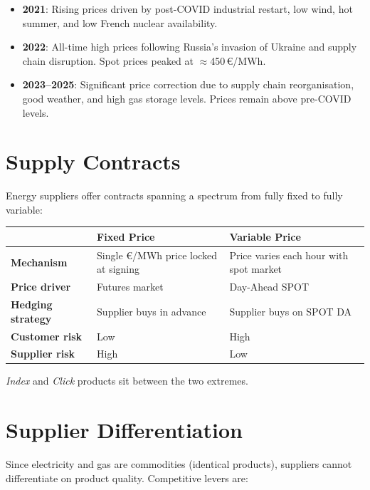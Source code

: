 \begin{itemize}[noitemsep]
    \item \textbf{2021}: Rising prices driven by post-COVID industrial restart, low wind, hot summer, and low French nuclear availability.
    \item \textbf{2022}: All-time high prices following Russia's invasion of Ukraine and supply chain disruption. Spot prices peaked at $\approx$450\,€/MWh.
    \item \textbf{2023–2025}: Significant price correction due to supply chain reorganisation, good weather, and high gas storage levels. Prices remain above pre-COVID levels.
\end{itemize}

\section{Supply Contracts}

Energy suppliers offer contracts spanning a spectrum from fully fixed to fully variable:

\begin{center}
\begin{tabular}{p{3.5cm}p{5cm}p{5cm}}
\toprule
 & \textbf{Fixed Price} & \textbf{Variable Price} \\
\midrule
\textbf{Mechanism} & Single €/MWh price locked at signing & Price varies each hour with spot market \\
\textbf{Price driver} & Futures market & Day-Ahead SPOT \\
\textbf{Hedging strategy} & Supplier buys in advance & Supplier buys on SPOT DA \\
\textbf{Customer risk} & Low & High \\
\textbf{Supplier risk} & High & Low \\
\bottomrule
\end{tabular}
\end{center}

\noindent \textit{Index} and \textit{Click} products sit between the two extremes.

\section{Supplier Differentiation}

Since electricity and gas are commodities (identical products), suppliers cannot differentiate on product quality. Competitive levers are:


